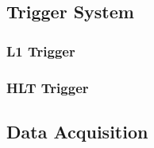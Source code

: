 \subsection{Trigger System}
\subsubsection{L1 Trigger}
\subsubsection{HLT Trigger}
\subsection{Data Acquisition}


